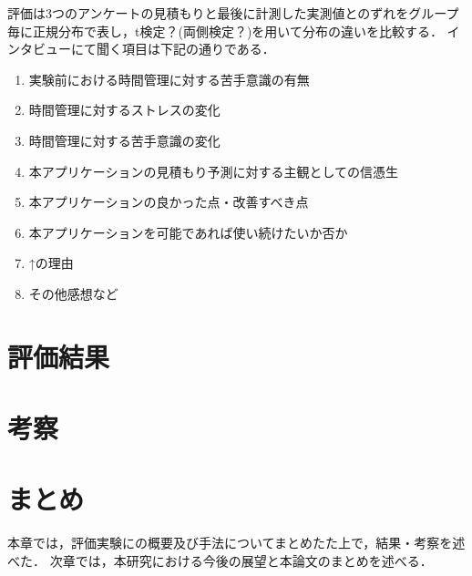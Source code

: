 評価は3つのアンケートの見積もりと最後に計測した実測値とのずれをグループ毎に正規分布で表し，t検定？(両側検定？)を用いて分布の違いを比較する．
インタビューにて聞く項目は下記の通りである．%
\begin{enumerate}
  \item 実験前における時間管理に対する苦手意識の有無
  \item 時間管理に対するストレスの変化
  \item 時間管理に対する苦手意識の変化
  \item 本アプリケーションの見積もり予測に対する主観としての信憑生
  \item 本アプリケーションの良かった点・改善すべき点
  \item 本アプリケーションを可能であれば使い続けたいか否か
  \item ↑の理由
  \item その他感想など
\end{enumerate}

\section{評価結果}

\section{考察}

\section{まとめ}
本章では，評価実験にの概要及び手法についてまとめたた上で，結果・考察を述べた．
次章では，本研究における今後の展望と本論文のまとめを述べる．
